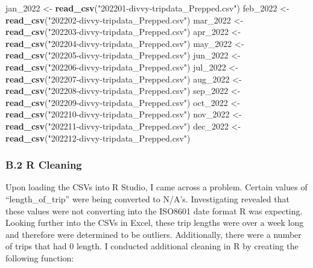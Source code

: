 \documentclass[
]{article}
\newenvironment{Shaded}{\begin{snugshade}}{\end{snugshade}}
\newcommand{\FunctionTok}[1]{\textcolor[rgb]{0.13,0.29,0.53}{\textbf{#1}}}
\newcommand{\NormalTok}[1]{#1}
\newcommand{\OtherTok}[1]{\textcolor[rgb]{0.56,0.35,0.01}{#1}}
\newcommand{\StringTok}[1]{\textcolor[rgb]{0.31,0.60,0.02}{#1}}
\begin{document}
\begin{Shaded}
\begin{Highlighting}[]
\NormalTok{jan\_2022 }\OtherTok{\textless{}{-}} \FunctionTok{read\_csv}\NormalTok{(}\StringTok{"202201{-}divvy{-}tripdata\_Prepped.csv"}\NormalTok{)}
\NormalTok{feb\_2022 }\OtherTok{\textless{}{-}} \FunctionTok{read\_csv}\NormalTok{(}\StringTok{"202202{-}divvy{-}tripdata\_Prepped.csv"}\NormalTok{)}
\NormalTok{mar\_2022 }\OtherTok{\textless{}{-}} \FunctionTok{read\_csv}\NormalTok{(}\StringTok{"202203{-}divvy{-}tripdata\_Prepped.csv"}\NormalTok{)}
\NormalTok{apr\_2022 }\OtherTok{\textless{}{-}} \FunctionTok{read\_csv}\NormalTok{(}\StringTok{"202204{-}divvy{-}tripdata\_Prepped.csv"}\NormalTok{)}
\NormalTok{may\_2022 }\OtherTok{\textless{}{-}} \FunctionTok{read\_csv}\NormalTok{(}\StringTok{"202205{-}divvy{-}tripdata\_Prepped.csv"}\NormalTok{)}
\NormalTok{jun\_2022 }\OtherTok{\textless{}{-}} \FunctionTok{read\_csv}\NormalTok{(}\StringTok{"202206{-}divvy{-}tripdata\_Prepped.csv"}\NormalTok{)}
\NormalTok{jul\_2022 }\OtherTok{\textless{}{-}} \FunctionTok{read\_csv}\NormalTok{(}\StringTok{"202207{-}divvy{-}tripdata\_Prepped.csv"}\NormalTok{)}
\NormalTok{aug\_2022 }\OtherTok{\textless{}{-}} \FunctionTok{read\_csv}\NormalTok{(}\StringTok{"202208{-}divvy{-}tripdata\_Prepped.csv"}\NormalTok{)}
\NormalTok{sep\_2022 }\OtherTok{\textless{}{-}} \FunctionTok{read\_csv}\NormalTok{(}\StringTok{"202209{-}divvy{-}tripdata\_Prepped.csv"}\NormalTok{)}
\NormalTok{oct\_2022 }\OtherTok{\textless{}{-}} \FunctionTok{read\_csv}\NormalTok{(}\StringTok{"202210{-}divvy{-}tripdata\_Prepped.csv"}\NormalTok{)}
\NormalTok{nov\_2022 }\OtherTok{\textless{}{-}} \FunctionTok{read\_csv}\NormalTok{(}\StringTok{"202211{-}divvy{-}tripdata\_Prepped.csv"}\NormalTok{)}
\NormalTok{dec\_2022 }\OtherTok{\textless{}{-}} \FunctionTok{read\_csv}\NormalTok{(}\StringTok{"202212{-}divvy{-}tripdata\_Prepped.csv"}\NormalTok{)}
\end{Highlighting}
\end{Shaded}

\hypertarget{b.2-r-cleaning}{%
\subsubsection{B.2 R Cleaning}\label{b.2-r-cleaning}}

Upon loading the CSVs into R Studio, I came across a problem. Certain
values of ``length\_of\_trip'' were being converted to N/A's.
Investigating revealed that these values were not converting into the
ISO8601 date format R was expecting. Looking further into the CSVs in
Excel, these trip lengths were over a week long and therefore were
determined to be outliers. Additionally, there were a number of trips
that had 0 length. I conducted additional cleaning in R by creating the
following function:
\end{document}
